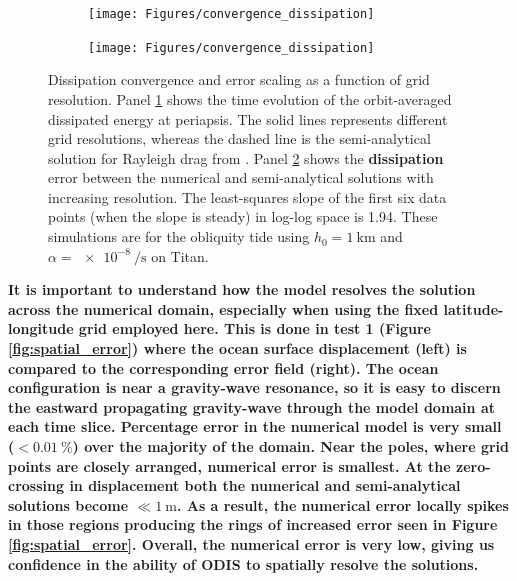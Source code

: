\begin{figure}[!t]
    \centering
    \begin{subfigure}[t]{\linewidth} %
        \texttt{[image: Figures/convergence\_dissipation]}
        \label{fig:conv_a}
    \end{subfigure}
    \begin{subfigure}[t]{0\linewidth} %
         \texttt{[image: Figures/convergence\_dissipation]}
         \label{fig:conv_b}   
    \end{subfigure}
    \vspace{-0.5cm}
\caption{Dissipation convergence and error scaling as a function of grid resolution. Panel \ref{fig:conv_a} shows the time evolution of the orbit-averaged dissipated energy at periapsis. The solid lines represents different grid resolutions, whereas the dashed line is the semi-analytical solution for Rayleigh drag from \citet{matsuyama2014tidal}. Panel \ref{fig:conv_b} shows the \textbf{dissipation} error between the numerical and semi-analytical solutions with increasing resolution. The least-squares slope of the first six data points (when the slope is steady) in log-log space is \num{1.94}. These simulations are for the obliquity tide using $h_0 = \SI{1}{\kilo\metre}$ and $\alpha = \SI{e-8}{\per\second}$ on Titan. \label{fig:conv}}
\end{figure}

\textbf{It is important to understand how the model resolves the solution across the numerical domain, especially when using the fixed latitude-longitude grid employed here. This is done in test 1 (Figure \ref{fig:spatial_error}) where the ocean surface displacement (left) is compared to the corresponding error field (right). The ocean configuration is near a gravity-wave resonance, so it is easy to discern the eastward propagating gravity-wave through the model domain at each time slice. Percentage error in the numerical model is very small ($< \SI{0.01}{\percent}$) over the majority of the domain. Near the poles, where grid points are closely arranged, numerical error is smallest. At the zero-crossing in displacement both the numerical and semi-analytical solutions become $\ll \SI{1}{\metre}$. As a result, the numerical error locally spikes in those regions producing the rings of increased error seen in Figure \ref{fig:spatial_error}. Overall, the numerical error is very low, giving us confidence in the ability of ODIS to spatially resolve the solutions.}  

